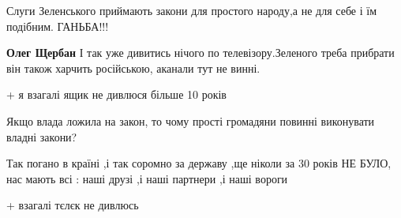 \begin{itemize}
 
Слуги Зеленського приймають закони для простого народу,а не для себе і їм подібним. ГАНЬБА!!!

 
\textbf{Олег Щербан} І так уже дивитись нічого по телевізору.Зеленого треба прибрати він також харчить російською, аканали тут не винні.

 
+ я взагалі ящик не дивлюся більше 10 років


 
Якщо влада ложила на закон, то чому прості громадяни повинні виконувати владні закони?

 
Так погано в країні ,і так соромно за державу ,ще ніколи за 30 років НЕ БУЛО, нас мають всі : наші друзі ,і наші партнери ,і наші вороги

 
+
взагалі тєлєк не дивлюсь

 

\end{itemize}
